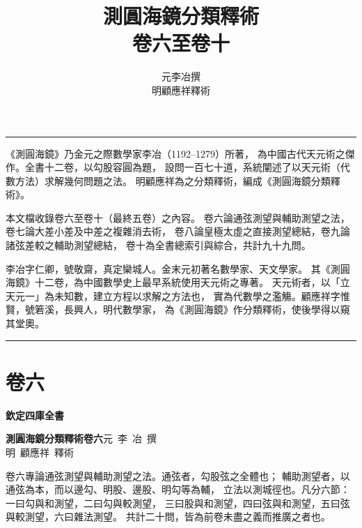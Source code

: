 \documentclass[12pt,a4paper]{article}
\title{\Huge 測圓海鏡分類釋術\\[0.5em]\Large 卷六至卷十}
\author{\Large 元\quad 李\quad 冶\quad 撰\\[0.3em]\Large 明\quad 顧應祥\quad 釋術}
\date{}
\newcommand{\Volume}[1]{\newpage\section*{卷#1}}
\begin{document}
\maketitle
\thispagestyle{empty}

\vspace{2em}
\begin{center}
\rule{0.6\textwidth}{0.5pt}
\end{center}

\vspace{1em}
\noindent
《測圓海鏡》乃金元之際數學家李冶（1192--1279）所著，
為中國古代天元術之傑作。全書十二卷，以勾股容圓為題，
設問一百七十道，系統闡述了以天元術（代數方法）求解幾何問題之法。
明顧應祥為之分類釋術，編成《測圓海鏡分類釋術》。

\vspace{0.5em}
\noindent
本文檔收錄卷六至卷十（最終五卷）之內容。
卷六論通弦測望與輔助測望之法，卷七論大差小差及中差之複雜消去術，
卷八論皇極太虛之直接測望總結，卷九論諸弦差較之輔助測望總結，
卷十為全書總索引與綜合，共計九十九問。

\vspace{0.5em}
\noindent
李冶字仁卿，號敬齋，真定欒城人。金末元初著名數學家、天文學家。
其《測圓海鏡》十二卷，為中國數學史上最早系統使用天元術之專著。
天元術者，以「立天元一」為未知數，建立方程以求解之方法也，
實為代數學之濫觴。顧應祥字惟賢，號箬溪，長興人，明代數學家，
為《測圓海鏡》作分類釋術，使後學得以窺其堂奧。

\vspace{2em}
\begin{center}
\rule{0.6\textwidth}{0.5pt}
\end{center}

\newpage
\tableofcontents
\newpage

\Volume{六}

\noindent\textbf{欽定四庫全書}

\noindent\textbf{測圓海鏡分類釋術卷六}\quad 元~李~冶~撰\\
明~顧應祥~釋術

\vspace{1em}

\noindent
卷六專論通弦測望與輔助測望之法。通弦者，勾股弦之全體也；
輔助測望者，以通弦為本，而以邊勾、明股、邊股、明勾等為輔，
立法以測城徑也。凡分六節：一曰勾與和測望，二曰勾與較測望，
三曰股與和測望，四曰弦與和測望，五曰弦與較測望，六曰雜法測望。
共計二十問，皆為前卷未盡之義而推廣之者也。
\end{document}
